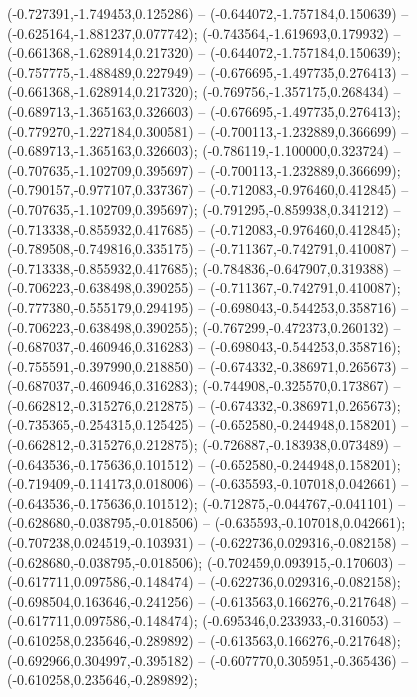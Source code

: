  (-0.727391,-1.749453,0.125286) -- (-0.644072,-1.757184,0.150639) -- (-0.625164,-1.881237,0.077742);
 (-0.743564,-1.619693,0.179932) -- (-0.661368,-1.628914,0.217320) -- (-0.644072,-1.757184,0.150639);
 (-0.757775,-1.488489,0.227949) -- (-0.676695,-1.497735,0.276413) -- (-0.661368,-1.628914,0.217320);
 (-0.769756,-1.357175,0.268434) -- (-0.689713,-1.365163,0.326603) -- (-0.676695,-1.497735,0.276413);
 (-0.779270,-1.227184,0.300581) -- (-0.700113,-1.232889,0.366699) -- (-0.689713,-1.365163,0.326603);
 (-0.786119,-1.100000,0.323724) -- (-0.707635,-1.102709,0.395697) -- (-0.700113,-1.232889,0.366699);
 (-0.790157,-0.977107,0.337367) -- (-0.712083,-0.976460,0.412845) -- (-0.707635,-1.102709,0.395697);
 (-0.791295,-0.859938,0.341212) -- (-0.713338,-0.855932,0.417685) -- (-0.712083,-0.976460,0.412845);
 (-0.789508,-0.749816,0.335175) -- (-0.711367,-0.742791,0.410087) -- (-0.713338,-0.855932,0.417685);
 (-0.784836,-0.647907,0.319388) -- (-0.706223,-0.638498,0.390255) -- (-0.711367,-0.742791,0.410087);
 (-0.777380,-0.555179,0.294195) -- (-0.698043,-0.544253,0.358716) -- (-0.706223,-0.638498,0.390255);
 (-0.767299,-0.472373,0.260132) -- (-0.687037,-0.460946,0.316283) -- (-0.698043,-0.544253,0.358716);
 (-0.755591,-0.397990,0.218850) -- (-0.674332,-0.386971,0.265673) -- (-0.687037,-0.460946,0.316283);
 (-0.744908,-0.325570,0.173867) -- (-0.662812,-0.315276,0.212875) -- (-0.674332,-0.386971,0.265673);
 (-0.735365,-0.254315,0.125425) -- (-0.652580,-0.244948,0.158201) -- (-0.662812,-0.315276,0.212875);
 (-0.726887,-0.183938,0.073489) -- (-0.643536,-0.175636,0.101512) -- (-0.652580,-0.244948,0.158201);
 (-0.719409,-0.114173,0.018006) -- (-0.635593,-0.107018,0.042661) -- (-0.643536,-0.175636,0.101512);
 (-0.712875,-0.044767,-0.041101) -- (-0.628680,-0.038795,-0.018506) -- (-0.635593,-0.107018,0.042661);
 (-0.707238,0.024519,-0.103931) -- (-0.622736,0.029316,-0.082158) -- (-0.628680,-0.038795,-0.018506);
 (-0.702459,0.093915,-0.170603) -- (-0.617711,0.097586,-0.148474) -- (-0.622736,0.029316,-0.082158);
 (-0.698504,0.163646,-0.241256) -- (-0.613563,0.166276,-0.217648) -- (-0.617711,0.097586,-0.148474);
 (-0.695346,0.233933,-0.316053) -- (-0.610258,0.235646,-0.289892) -- (-0.613563,0.166276,-0.217648);
 (-0.692966,0.304997,-0.395182) -- (-0.607770,0.305951,-0.365436) -- (-0.610258,0.235646,-0.289892);
